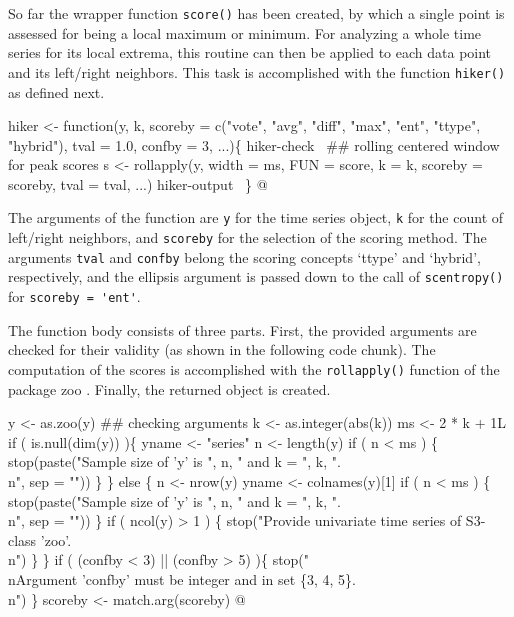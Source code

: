 \documentclass[a4paper]{article}
\newcommand{\pkg}[1]{{\fontseries{b}\selectfont #1}}
\begin{document}
So far the wrapper function \verb?score()? has been created, by which a single
point is assessed for being a local maximum or minimum. For analyzing
a whole time series for its local extrema, this routine can then be applied
to each data point and its left/right neighbors. This task is
accomplished with the function \verb?hiker()? as defined next.

\nwenddocs{}\endmoddef
hiker <- function(y, k,
                  scoreby = c("vote", "avg", "diff", "max", "ent",
                              "ttype", "hybrid"),
                  tval = 1.0, confby = 3, ...)\{
\LA{}hiker-check~{\nwtagstyle{}}\RA{}
    ## rolling centered window for peak scores
    s <- rollapply(y, width = ms, FUN = score,
                   k = k, scoreby = scoreby, tval = tval, ...)
\LA{}hiker-output~{\nwtagstyle{}}\RA{}
\}
\nwendcode{}@

The arguments of the function are \verb?y? for the time series object,
\verb?k? for the count of left/right neighbors, and \verb?scoreby? for the
selection of the scoring method. The arguments \verb?tval? and \verb?confby?
belong the scoring concepts `ttype' and `hybrid', respectively, and
the ellipsis argument is passed down to the call of \verb?scentropy()?
for \verb?scoreby = 'ent'?.\par

The function body consists of three parts. First, the provided
arguments are checked for their validity (as shown in the following
code chunk). The computation of the scores is accomplished with the
\verb?rollapply()? function of the package \pkg{zoo}
\citep[see][]{ZEI2005}. Finally, the returned object is created.\par

\nwenddocs{}\endmoddef
    y <- as.zoo(y)
    ## checking arguments
    k <- as.integer(abs(k))
    ms <- 2 * k + 1L
    if ( is.null(dim(y)) )\{
        yname <- "series"
        n <- length(y)
        if ( n < ms ) \{
            stop(paste("Sample size of 'y' is ", n,
                       " and k = ", k, ".\\n", sep = ""))
            \}
    \} else \{
        n <- nrow(y)
        yname <- colnames(y)[1]
        if ( n < ms ) \{
            stop(paste("Sample size of 'y' is ", n,
                       " and k = ", k, ".\\n", sep = ""))
        \}
        if ( ncol(y) > 1 ) \{
            stop("Provide univariate time series of S3-class 'zoo'.\\n")
        \}
    \}
    if ( (confby < 3) || (confby > 5) )\{
        stop("\\nArgument 'confby' must be integer and in set \{3, 4, 5\}.\\n")
    \}
    scoreby <- match.arg(scoreby)
\nwendcode{}@
\end{document}
